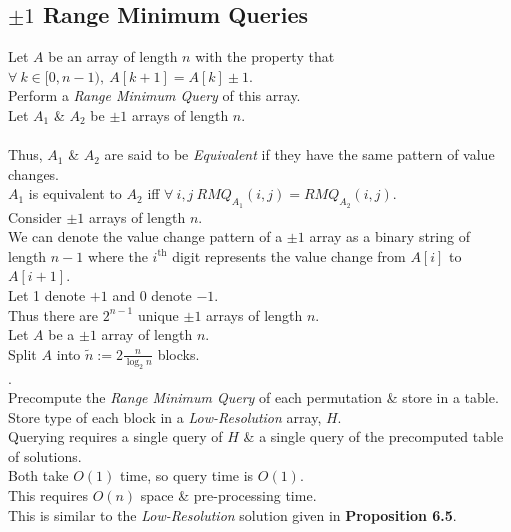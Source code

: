 \documentclass[11pt,a4paper]{article}
\begin{document}
\subsection{$\pm1$ Range Minimum Queries}

Let $A$ be an array of length $n$ with the property that $\forall\ k\in[0,n-1),\ A[k+1]=A[k]\pm1$.\\
Perform a \textit{Range Minimum Query} of this array.\\

Let $A_1$ \& $A_2$ be $\pm1$ arrays of length $n$.\\
\\
Thus, $A_1$ \& $A_2$ are said to be \textit{Equivalent} if they have the same pattern of value changes.\\
\ie $A_1$ is equivalent to $A_2$ iff $\forall\ i,j\ RMQ_{A_1}(i,j)=RMQ_{A_2}(i,j)$.\\

Consider $\pm1$ arrays of length $n$.\\
We can denote the value change pattern of a $\pm1$ array as a binary string of length $n-1$ where the $i^\text{th}$ digit represents the value change from $A[i]$ to $A[i+1]$.\\
Let 1 denote $+1$ and 0 denote $-1$.\\
Thus there are $2^{n-1}$ unique $\pm1$ arrays of length $n$.\\

Let $A$ be a $\pm1$ array of length $n$.\\
Split $A$ into $\tilde{n}:=2\frac{n}{\log_2n}$ blocks.\\
.\\
Precompute the \textit{Range Minimum Query} of each permutation \& store in a table.\\
Store type of each block in a \textit{Low-Resolution} array, $H$.\\
Querying requires a single query of $H$ \& a single query of the precomputed table of solutions.\\
Both take $O(1)$ time, so query time is $O(1)$.\\
This requires $O(n)$ space \& pre-processing time.\\
\nb This is similar to the \textit{Low-Resolution} solution given in \textbf{Proposition 6.5}.
\end{document}
